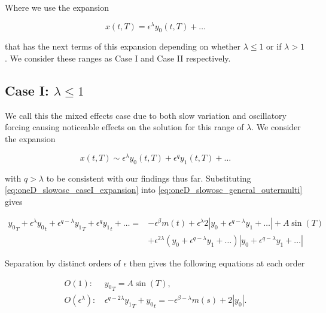 Where we use the expansion 

\begin{equation*}
x(t,T) = \epsilon^{\lambda}y_0(t,T) +\ldots 
\end{equation*}

that has the next terms of this expansion depending on whether $\lambda\le1$ or if $\lambda> 1$. We consider these ranges as Case I and Case II respectively.

\subsection{Case I: $\lambda \le 1$}
\label{subsec:oneD_slowosc_caseI}

We call this the mixed effects case due to both slow variation and oscillatory forcing causing noticeable effects on the solution for this range of $\lambda$. We consider the expansion

\begin{equation}\label{eq:oneD_slowosc_caseI_expansion}
x(t,T)\sim \epsilon^{\lambda} y_0(t,T)+\epsilon^q y_1(t,T)+\ldots
\end{equation}

with $q>\lambda$ to be consistent with our findings thus far. Substituting \eqref{eq:oneD_slowosc_caseI_expansion} into \eqref{eq:oneD_slowosc_general_outermulti} gives

\begin{equation*}
\begin{aligned}
{y_0}_T+\epsilon^{\lambda}{y_0}_t+\epsilon^{q-\lambda} {y_1}_T+\epsilon^{q} {y_1}_t+\ldots={} & -\epsilon^{\beta}m(t)+\epsilon^\lambda 2|y_0 +\epsilon^{q-\lambda} y_1+\ldots|+  A\sin(T)  \\
& + \epsilon^{2\lambda}( y_0 +\epsilon^{q-\lambda} y_1+\ldots)|y_0 +\epsilon^{q-\lambda} y_1+\ldots |
\end{aligned}
\end{equation*}

Separation by distinct orders of $\epsilon$ then gives the following equations at each order

\begin{align} \label{eq:oneD_slowosc_caseI_O1}
O(1):\, & {y_0}_T = A\sin(T),\\ \label{eq:oneD_slowosc_caseI_O2}
O(\epsilon^\lambda): \, & \epsilon^{q-2\lambda}{y_1}_T+{y_0}_t=-\epsilon^{\beta-\lambda}m(s)+2|y_0|.
\end{align}

